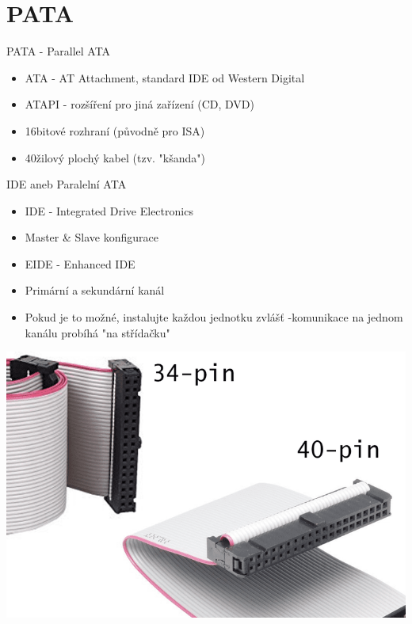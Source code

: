 \documentclass[aspectratio=43]{beamer}
\begin{document}
\section{PATA}
\begin{frame}{PATA - Parallel ATA}
	\begin{itemize}
		\item ATA - AT Attachment, standard IDE od Western Digital
		\item ATAPI - rozšíření pro jiná zařízení (CD, DVD)
		\item 16bitové rozhraní (původně pro ISA)
		\item 40žilový plochý kabel (tzv. "kšanda")
	\end{itemize}
\end{frame}


\begin{frame}{IDE aneb Paralelní ATA}
	\begin{itemize}
		\item IDE - Integrated Drive Electronics
		\item Master & Slave konfigurace
		\item EIDE - Enhanced IDE
		\item Primární a sekundární kanál
		\item Pokud je to možné, instalujte každou jednotku zvlášť -komunikace na jednom kanálu probíhá "na střídačku"
	\end{itemize}
	\begin{center}
		\includegraphics[width=0.6\linewidth]{extrahovane_obrazky/ide.png}
	\end{center}
\end{frame}
\end{document}

